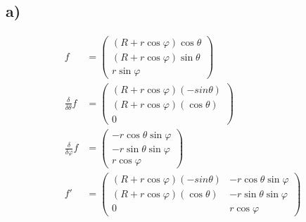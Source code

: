 \documentclass[10pt,a4paper]{article}
\begin{document}
\subsection*{a)}
\begin{align*}
f &= \begin{pmatrix}
    (R + r \cos \varphi) \cos \theta \\
    (R + r \cos \varphi) \sin \theta \\
    r \sin \varphi
\end{pmatrix}\\
\frac{\delta}{\delta\theta}f &= \begin{pmatrix}
    (R + r \cos \varphi)  ( -sin \theta) \\
    (R + r \cos \varphi)  (\cos \theta) \\
    0
\end{pmatrix}\\
\frac{\delta}{\delta\varphi}f &= \begin{pmatrix}
    - r \cos \theta \sin \varphi\\
    - r \sin \theta \sin \varphi\\
    r \cos \varphi
\end{pmatrix}\\
f' &= \begin{pmatrix}
    (R + r \cos \varphi) ( -sin \theta) & - r \cos \theta \sin \varphi \\
    (R + r \cos \varphi) (\cos \theta) & - r \sin \theta \sin \varphi\\
    0 & r \cos \varphi
\end{pmatrix}
\end{align*}
\end{document}
